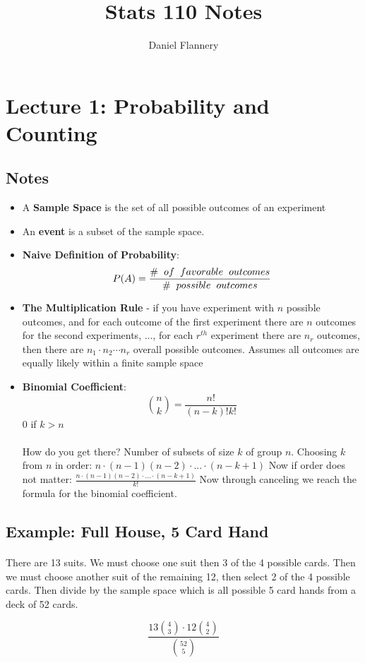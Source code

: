 \documentclass[11pt, oneside]{article}   	%
\title{Stats 110 Notes}
\author{Daniel Flannery}
\begin{document}
\maketitle
\tableofcontents

\section{Lecture 1: Probability and Counting}					
	\subsection{Notes}
	\begin{itemize}
		\item A \textbf{Sample Space} is the set of all possible outcomes of an experiment
		\item An \textbf{event} is a subset of the sample space.
		\item \textbf{Naive Definition of Probability}: \[P(A) = \frac{\# \hspace{2mm} of \hspace{2mm} favorable \hspace{2mm} outcomes}{\# \hspace{2mm} possible \hspace{2mm} outcomes}\]
		\item \textbf{The Multiplication Rule} - if you have experiment with $n$ possible outcomes, and for each outcome of the first experiment there 		are $n$ outcomes for the second experiments, ..., for each $r^{th}$ experiment there are $n_{r}$ outcomes, then there are $n_{1} \cdot n_{2} \cdots n_{r}$ overall possible outcomes.
		Assumes all outcomes are equally likely within a finite sample space
		\item \textbf{Binomial Coefficient}: \[ \binom{n}{k} = \frac{n!}{(n-k)!k!} \] $0$ if $k > n$\\
		\\
		How do you get there?
		Number of subsets of size $k$ of group $n$. Choosing $k$ from $n$ in order: $n \cdot (n-1)(n-2) \cdot ... \cdot (n-k+1)$
		Now if order does not matter: $\frac{n \cdot (n-1)(n-2) \cdot ... \cdot (n-k+1)}{k!}$
		Now through canceling we reach the formula for the binomial coefficient.
		\end{itemize}
	\subsection{Example: Full House, 5 Card Hand}
		\paragraph{}
			There are 13 suits. We must choose one suit then 3 of the 4 possible cards. Then we must choose another suit of the remaining 12, then select 2 of the 4 possible cards. Then divide by the sample space which is all possible 5 card hands from a deck of 52 cards.
		\begin{center}
			\[ \frac{13\binom{4}{3}  \cdot  12\binom{4}{2}}{\binom{52}{5}} \]
		\end{center}
\end{document}
